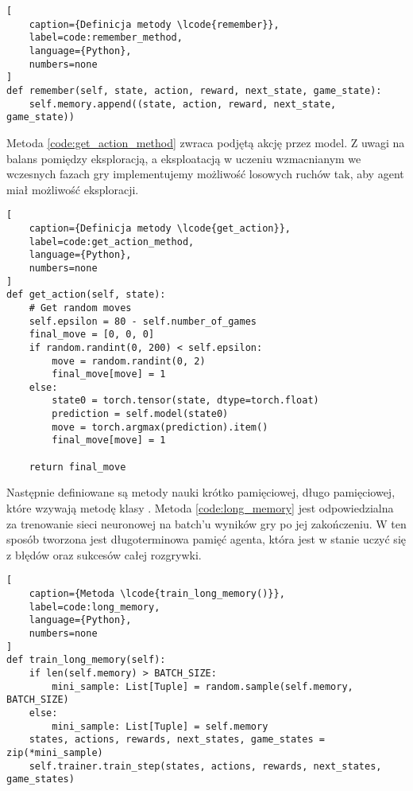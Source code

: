 \begin{onepage}
    \begin{lstlisting}[
    caption={Definicja metody \lcode{remember}},
    label=code:remember_method,
    language={Python},
    numbers=none
]
def remember(self, state, action, reward, next_state, game_state):
    self.memory.append((state, action, reward, next_state, game_state))
    \end{lstlisting}
\end{onepage}

Metoda  \ref{code:get_action_method} zwraca podjętą akcję przez model. Z uwagi na balans pomiędzy eksploracją, a eksploatacją w uczeniu wzmacnianym we wczesnych fazach gry implementujemy możliwość losowych ruchów tak, aby agent miał możliwość eksploracji.

\begin{onepage}
    \begin{lstlisting}[
    caption={Definicja metody \lcode{get_action}},
    label=code:get_action_method,
    language={Python},
    numbers=none
]
def get_action(self, state):
    # Get random moves
    self.epsilon = 80 - self.number_of_games
    final_move = [0, 0, 0]
    if random.randint(0, 200) < self.epsilon:
        move = random.randint(0, 2)
        final_move[move] = 1
    else:
        state0 = torch.tensor(state, dtype=torch.float)
        prediction = self.model(state0)
        move = torch.argmax(prediction).item()
        final_move[move] = 1

    return final_move
\end{lstlisting}
\end{onepage}



Następnie definiowane są metody nauki krótko pamięciowej, długo pamięciowej, które wzywają metodę  klasy .
Metoda  \ref{code:long_memory} jest odpowiedzialna za trenowanie sieci neuronowej na batch'u wyników gry po jej zakończeniu. W ten sposób tworzona jest długoterminowa pamięć agenta, która jest w stanie uczyć się z błędów oraz sukcesów całej rozgrywki.

\begin{onepage}
    \begin{lstlisting}[
    caption={Metoda \lcode{train_long_memory()}},
    label=code:long_memory,
    language={Python},
    numbers=none
]
def train_long_memory(self):
    if len(self.memory) > BATCH_SIZE:
        mini_sample: List[Tuple] = random.sample(self.memory, BATCH_SIZE)
    else:
        mini_sample: List[Tuple] = self.memory
    states, actions, rewards, next_states, game_states = zip(*mini_sample)
    self.trainer.train_step(states, actions, rewards, next_states, game_states)

\end{lstlisting}
\end{onepage}



